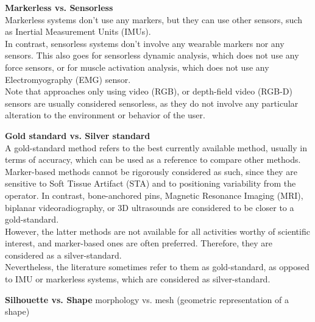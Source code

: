 \vspace*{0.5cm}

\noindent\textbf{Markerless vs. Sensorless}\\
Markerless systems don't use any markers, but they can use other sensors, such as Inertial Measurement Units (IMUs). \\
In contrast, sensorless systems don't involve any wearable markers nor any sensors. This also goes for sensorless dynamic analysis, which does not use any force sensors, or for muscle activation analysis, which does not use any Electromyography (EMG) sensor. \\
Note that approaches only using video (RGB), or depth-field video (RGB-D) sensors are usually considered sensorless, as they do not involve any particular alteration to the environment or behavior of the user.

\vspace*{0.5cm}

\noindent\textbf{Gold standard vs. Silver standard}\\
A gold-standard method refers to the best currently available method, usually in terms of accuracy, which can be used as a reference to compare other methods. \\
Marker-based methods cannot be rigorously considered as such, since they are sensitive to Soft Tissue Artifact (STA) and to positioning variability from the operator. In contrast, bone-anchored pins, Magnetic Resonance Imaging (MRI), biplanar videoradiography, or 3D ultrasounds are considered to be closer to a gold-standard. \\
However, the latter methods are not available for all activities worthy of scientific interest, and marker-based ones are often preferred. Therefore, they are considered as a silver-standard.\\
Nevertheless, the literature sometimes refer to them as gold-standard, as opposed to IMU or markerless systems, which are considered as silver-standard.

\vspace*{0.5cm}

\noindent\textbf{Silhouette vs. Shape}
morphology
vs. mesh (geometric representation of a shape)

\vspace*{0.5cm}

